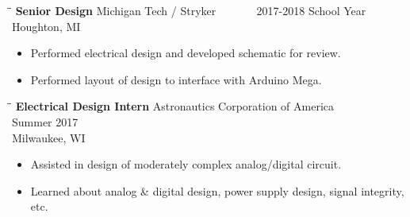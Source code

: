 \documentclass[letterpaper]{res}
\begin{document}
\begin{resume}
  \vspace{-0.15in}
  \begin{tabbing}
    \hspace{2.3in}\= \hspace{2.6in}\= \kill %
    {\bf Senior Design} \>Michigan Tech / Stryker \> ~~~~~~ 2017-2018 School Year\\
    \> Houghton, MI
  \end{tabbing}\vspace{-10pt}
  \begin{itemize} \itemsep1pt \parskip0pt 
    \item Performed electrical design and developed schematic for review.
    \item Performed layout of design to interface with Arduino Mega.
  \end{itemize}
  
  \vspace{-0.15in}
  \begin{tabbing}
    \hspace{2.3in}\= \hspace{2.6in}\= \kill %
    {\bf Electrical Design Intern} \>Astronautics Corporation of America \> ~~~~~~ Summer 2017\\
    \> Milwaukee, WI
  \end{tabbing}\vspace{-10pt}
  \begin{itemize} \itemsep1pt \parskip0pt 
    \item Assisted in design of moderately complex analog/digital circuit.
    \item Learned about analog \& digital design, power supply design, signal integrity, etc.
  \end{itemize}



\end{resume}
\end{document}

